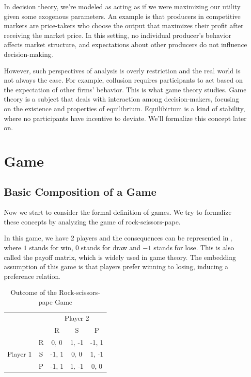 In decision theory, we're modeled as acting as if we were maximizing our utility given some exogenous parameters. 
An example is that producers in competitive markets are price-takers who choose the output that maximizes their profit after receiving the market price. In this setting, no individual producer's behavior affects market structure, and expectations about other producers do not influence decision-making.

However, such perspectives of analysis is overly restriction and the real world is not always the case. For example, collusion requires 
participants to act based on the expectation of other firms' behavior. This is what game theory studies. Game theory is a subject 
that deals with interaction among decision-makers, focusing on the existence and properties of equilibrium. Equilibirium is a kind of stability, where 
no participants have incentive to deviate. We'll formalize this concept later on.

\section{Game}
\subsection{Basic Composition of a Game}
Now we start to consider the formal definition of games. We try to formalize these concepts by analyzing the game of rock-scissors-pape.
\begin{example}
    In this game, we have 2 players and the consequences can be represented in , where $1$ stands for win, $0$ stands for draw and $-1$ stands for lose. This is also called the payoff matrix, which is widely used in game theory. The embedding assumption of this game is that players prefer winning to losing, inducing a preference relation.

\begin{table}[tbh]
\centering
\begin{tabular}{ccccc}
                          &                        & \multicolumn{3}{c}{Player 2}                                                         \\
                          &                        & R                          & S                          & P                          \\ \cline{3-5} 
\multirow{3}{*}{Player 1} & \multicolumn{1}{c|}{R} & \multicolumn{1}{c|}{0, 0}  & \multicolumn{1}{c|}{1, -1} & \multicolumn{1}{c|}{-1, 1} \\ \cline{3-5} 
                          & \multicolumn{1}{c|}{S} & \multicolumn{1}{c|}{-1, 1} & \multicolumn{1}{c|}{0, 0}  & \multicolumn{1}{c|}{1, -1} \\ \cline{3-5} 
                          & \multicolumn{1}{c|}{P} & \multicolumn{1}{c|}{-1, 1} & \multicolumn{1}{c|}{1, -1} & \multicolumn{1}{c|}{0, 0}  \\ \cline{3-5} 
\end{tabular}
\caption{Outcome of the Rock-scissors-pape Game}
\label{tab:Rock-scissors-pape}
\end{table}
\end{example}

